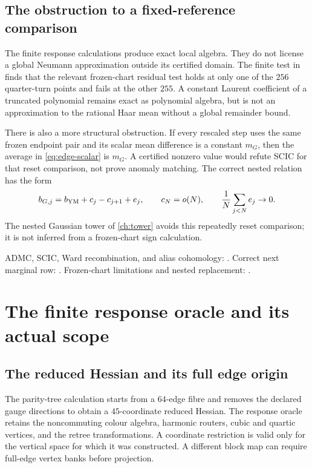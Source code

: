 \documentclass[11pt,oneside,openany]{book}
\theoremstyle{definition}
\theoremstyle{remark}
\newcommand{\src}[2]{\cite[#2]{#1}}
\newcommand{\sourcebasis}[1]{\par\smallskip\noindent #1\par}
\begin{document}
\section{The obstruction to a fixed-reference comparison}
The finite response calculations produce exact local algebra. They do not license a global Neumann approximation outside its certified domain. The finite test in \src{F11}{V31} finds that the relevant frozen-chart residual test holds at only one of the $256$ quarter-turn points and fails at the other $255$. A constant Laurent coefficient of a truncated polynomial remains exact as polynomial algebra, but is not an approximation to the rational Haar mean without a global remainder bound.

There is also a more structural obstruction. If every rescaled step uses the same frozen endpoint pair and its scalar mean difference is a constant $m_G$, then the average in \cref{eq:edge-scalar} is $m_G$. A certified nonzero value would refute SCIC for that reset comparison, not prove anomaly matching. The correct nested relation has the form
\begin{equation}\label{eq:nested-shell-cob}
b_{G,j}=b_{\rm YM}+c_j-c_{j+1}+e_j,
\qquad c_N=o(N),\qquad \frac1N\sum_{j<N}e_j\to0.
\end{equation}
The nested Gaussian tower of \cref{ch:tower} avoids this repeatedly reset comparison; it is not inferred from a frozen-chart sign calculation. \src{F11}{V31--V32}
\sourcebasis{ADMC, SCIC, Ward recombination, and alias cohomology: \src{F9}{V13--V17}. Correct next marginal row: \src{F10}{V100}. Frozen-chart limitations and nested replacement: \src{F11}{V31--V34}.}

\chapter{The finite response oracle and its actual scope}
\label{ch:oracle}
\section{The reduced Hessian and its full edge origin}
The parity-tree calculation starts from a $64$-edge fibre and removes the declared gauge directions to obtain a $45$-coordinate reduced Hessian. The response oracle retains the noncommuting colour algebra, harmonic routers, cubic and quartic vertices, and the retree transformations. A coordinate restriction is valid only for the vertical space for which it was constructed. A different block map can require full-edge vertex banks before projection.
\end{document}
